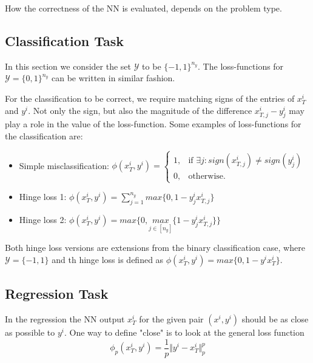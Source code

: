 \documentclass[a4paper, 12pt]{scrreprt} %
\begin{document}
How the correctness of the \ac{NN} is evaluated, depends on the problem type.

\subsection{Classification Task}
\label{subsec:clatas}
In this section we consider the set $\mathcal{Y}$ to be $\{-1,1\}^{n_y}$. The loss-functions for $\mathcal{Y} = \{0,1\}^{n_y}$ can be written in similar fashion.


For the classification to be correct, we require matching signs of the entries of $x^i_T$ and $y^i$. Not only the sign, but also the magnitude of the difference $x^i_{T,j}-y^i_j$ may play a role in the value of the loss-function. Some examples of loss-functions for the classification are:

\begin{itemize}
	\item Simple misclassification: $\phi(x^i_T,y^i) = \begin{cases} 1, & \text{if } \exists j : sign(x^i_{T,j}) \neq sign(y^i_j) \\
0, & \text{otherwise.}
\end{cases}$
	\item Hinge loss 1: $\phi(x^i_T,y^i) = \sum_{j=1}^{n_y}{max\{0,1-y^i_j x^i_{T,j}\}}$
	\item Hinge loss 2: $\phi(x^i_T,y^i) = max\{0,\underset{j \in [n_y]}{max}\{1-y^i_j x^i_{T,j}\}\}$
\end{itemize}

Both hinge loss versions are extensions from the binary classification case, where $\mathcal{Y} = \{-1,1\}$ and th hinge loss is defined as $\phi(x^i_T,y^i) = max\{0,1-y^i x^i_{T}\}$.


\subsection{Regression Task}
In the regression the \ac{NN} output $x^i_{T}$ for the given pair $(x^i,y^i)$ should be as close as possible to $y^i$. One way to define "close" is to look at the general loss function 
\begin{equation*}
\phi_p(x^i_T,y^i)=\frac{1}{p}\Vert y^i - x^i_T \Vert_p^p
\end{equation*}
\end{document}
